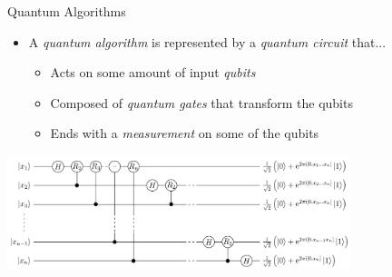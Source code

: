 \documentclass[aspectratio=169, handout]{beamer}
\begin{document}
\begin{frame}{Quantum Algorithms}
    \begin{itemize}
        \item A \emph{quantum algorithm} is represented by a \emph{quantum circuit} that... \pause
        \begin{itemize}
            \item Acts on some amount of input \emph{qubits} \pause
            \item Composed of \emph{quantum gates} that transform the qubits \pause
            \item Ends with a \emph{measurement} on some of the qubits \pause
        \end{itemize}
    \end{itemize}
    \begin{center}
    \includegraphics[width=100mm]{QFT.png} \cite{site:qft}
    \end{center}
\end{frame}
\end{document}
